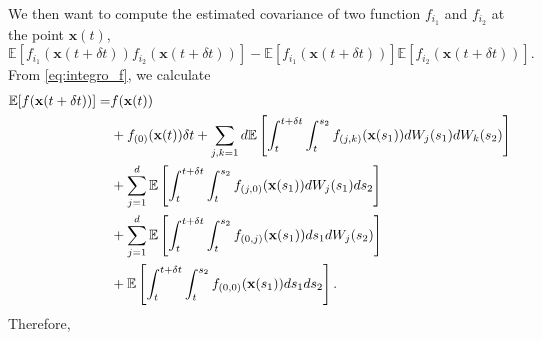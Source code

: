 We then want to compute the estimated covariance of two function $f_{i_1}$ and $f_{i_2}$ at the point $\mathbf{x}(t)$,
%
\begin{equation}
\mathbb{E}[f_{i_1}(\mathbf{x}(t + \delta t))f_{i_2}(\mathbf{x}(t + \delta t))] - \mathbb{E}[f_{i_1}(\mathbf{x}(t + \delta t))]\mathbb{E}[f_{i_2}(\mathbf{x}(t + \delta t))].
\end{equation}
%
From \eqref{eq:integro_f}, we calculate
\begin{equation}
\begin{aligned}
\mathbb{E} [f(\mathbf{x}(t+\delta t))] =&
f(\mathbf{x}(t)) \\
&+  f_{(0)}(\mathbf{x}(t)) \delta t
+ \sum_{j, k=1}d \mathbb{E} \left[ \int_t^{t+\delta t} \int_t^{s_2} f_{(j,k)}(\mathbf{x}(s_1)) dW_j(s_1) dW_k(s_2) \right] \\
&+ \sum_{j=1}^d \mathbb{E} \left[ \int_t^{t+\delta t} \int_t^{s_2} f_{(j,0)}(\mathbf{x}(s_1)) dW_j(s_1) ds_2  \right]\\
&+ \sum_{j=1}^d \mathbb{E} \left[  \int_t^{t+\delta t} \int_t^{s_2} f_{(0,j)}(\mathbf{x}(s_1)) ds_1 dW_j(s_2) \right] \\
&+ \mathbb{E} \left[ \int_t^{t+\delta t} \int_t^{s_2} f_{(0,0)}(\mathbf{x}(s_1)) ds_1 ds_2  \right].
\end{aligned}
\end{equation}
%
Therefore,
%
